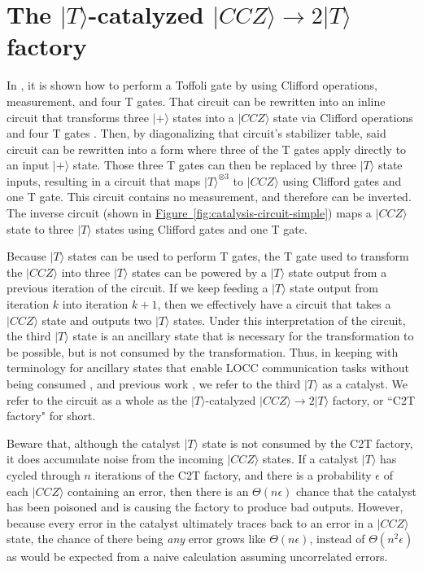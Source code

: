 \documentclass[superscriptaddress,notitlepage,longbibliography]{revtex4-1}
\newcommand{\fig}[1]{\hyperref[fig:#1]{Figure~\ref*{fig:#1}}}
\begin{document}
\section{\texorpdfstring{
    The $|T\rangle$-catalyzed $|CCZ\rangle \rightarrow 2|T\rangle$ factory
}{
    The T-catalyzed CCZ to 2T Factory
}}
\label{sec:catalysis}

In \cite{jones2013}, it is shown how to perform a Toffoli gate by using Clifford operations, measurement, and four T gates.
That circuit can be rewritten into an inline circuit that transforms three $|+\rangle$ states into a $|CCZ\rangle$ state via Clifford operations and four T gates \cite{gidney2018}.
Then, by diagonalizing that circuit's stabilizer table, said circuit can be rewritten into a form where three of the T gates apply directly to an input $|+\rangle$ state.
Those three T gates can then be replaced by three $|T\rangle$ state inputs, resulting in a circuit that maps $|T\rangle^{\otimes 3}$ to $|CCZ\rangle$ using Clifford gates and one T gate.
This circuit contains no measurement, and therefore can be inverted.
The inverse circuit (shown in \fig{catalysis-circuit-simple}) maps a $|CCZ\rangle$ state to three $|T\rangle$ states using Clifford gates and one T gate.

Because $|T\rangle$ states can be used to perform T gates, the T gate used to transform the $|CCZ\rangle$ into three $|T\rangle$ states can be powered by a $|T\rangle$ state output from a previous iteration of the circuit.
If we keep feeding a $|T\rangle$ state output from iteration $k$ into iteration $k+1$, then we effectively have a circuit that takes a $|CCZ\rangle$ state and outputs two $|T\rangle$ states.
Under this interpretation of the circuit, the third $|T\rangle$ state is an ancillary state that is necessary for the transformation to be possible, but is not consumed by the transformation.
Thus, in keeping with terminology for ancillary states that enable LOCC communication tasks without being consumed \cite{jonathan1999}, and previous work \cite{campbell2011catalysis}, we refer to the third $|T\rangle$ as a catalyst.
We refer to the circuit as a whole as the $|T\rangle$-catalyzed $|CCZ\rangle \rightarrow 2|T\rangle$ factory, or ``C2T factory" for short.

Beware that, although the catalyst $|T\rangle$ state is not consumed by the C2T factory, it does accumulate noise from the incoming $|CCZ\rangle$ states.
If a catalyst $|T\rangle$ has cycled through $n$ iterations of the C2T factory, and there is a probability $\epsilon$ of each $|CCZ\rangle$ containing an error, then there is an $\Theta(n \epsilon)$ chance that the catalyst has been poisoned and is causing the factory to produce bad outputs.
However, because every error in the catalyst ultimately traces back to an error in a $|CCZ\rangle$ state, the chance of there being {\em any} error grows like $\Theta(n \epsilon)$, instead of $\Theta(n^2 \epsilon)$ as would be expected from a naive calculation assuming uncorrelated errors.
\end{document}

